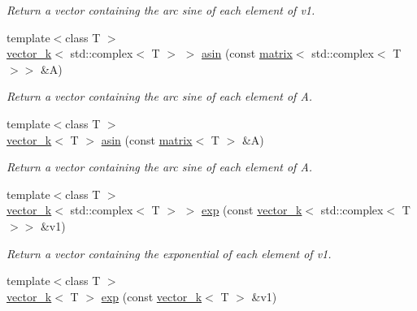 \begin{DoxyCompactItemize}
\begin{DoxyCompactList}\small\item\em Return a vector containing the arc sine of each element of v1. \end{DoxyCompactList}\item 
\hypertarget{namespacekeycpp_a4de772a2b10be65e2997cbb1f0f08853}{{\footnotesize template$<$class T $>$ }\\\hyperlink{classkeycpp_1_1vector__k}{vector\-\_\-k}$<$ std\-::complex$<$ T $>$ $>$ \hyperlink{namespacekeycpp_a4de772a2b10be65e2997cbb1f0f08853}{asin} (const \hyperlink{classkeycpp_1_1matrix}{matrix}$<$ std\-::complex$<$ T $>$$>$ \&A)}\label{namespacekeycpp_a4de772a2b10be65e2997cbb1f0f08853}

\begin{DoxyCompactList}\small\item\em Return a vector containing the arc sine of each element of A. \end{DoxyCompactList}\item 
\hypertarget{namespacekeycpp_a25e9b69ef51cf53cc780fd5a99bcde1b}{{\footnotesize template$<$class T $>$ }\\\hyperlink{classkeycpp_1_1vector__k}{vector\-\_\-k}$<$ T $>$ \hyperlink{namespacekeycpp_a25e9b69ef51cf53cc780fd5a99bcde1b}{asin} (const \hyperlink{classkeycpp_1_1matrix}{matrix}$<$ T $>$ \&A)}\label{namespacekeycpp_a25e9b69ef51cf53cc780fd5a99bcde1b}

\begin{DoxyCompactList}\small\item\em Return a vector containing the arc sine of each element of A. \end{DoxyCompactList}\item 
\hypertarget{namespacekeycpp_abb06bdc0fc2627f8f5390e0b1da588c3}{{\footnotesize template$<$class T $>$ }\\\hyperlink{classkeycpp_1_1vector__k}{vector\-\_\-k}$<$ std\-::complex$<$ T $>$ $>$ \hyperlink{namespacekeycpp_abb06bdc0fc2627f8f5390e0b1da588c3}{exp} (const \hyperlink{classkeycpp_1_1vector__k}{vector\-\_\-k}$<$ std\-::complex$<$ T $>$$>$ \&v1)}\label{namespacekeycpp_abb06bdc0fc2627f8f5390e0b1da588c3}

\begin{DoxyCompactList}\small\item\em Return a vector containing the exponential of each element of v1. \end{DoxyCompactList}\item 
\hypertarget{namespacekeycpp_a22e3ee37c7d6c67e9951d9546082b8b8}{{\footnotesize template$<$class T $>$ }\\\hyperlink{classkeycpp_1_1vector__k}{vector\-\_\-k}$<$ T $>$ \hyperlink{namespacekeycpp_a22e3ee37c7d6c67e9951d9546082b8b8}{exp} (const \hyperlink{classkeycpp_1_1vector__k}{vector\-\_\-k}$<$ T $>$ \&v1)}\label{namespacekeycpp_a22e3ee37c7d6c67e9951d9546082b8b8}


\end{DoxyCompactItemize}
